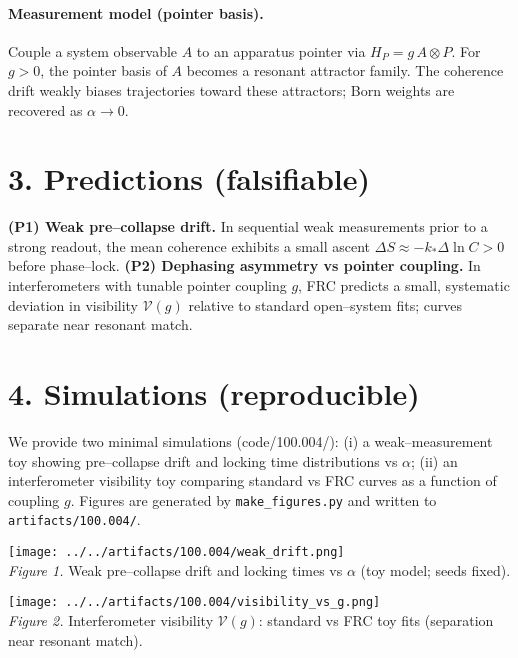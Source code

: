 \documentclass[10pt]{article}
\begin{document}
\paragraph{Measurement model (pointer basis).}
Couple a system observable $A$ to an apparatus pointer via $H_P=g\,A\otimes P$. For $g>0$, the pointer basis of $A$ becomes a resonant attractor family. The coherence drift weakly biases trajectories toward these attractors; Born weights are recovered as $\alpha\to 0$.

\section*{3. Predictions (falsifiable)}
\textbf{(P1) Weak pre--collapse drift.} In sequential weak measurements prior to a strong readout, the mean coherence exhibits a small ascent $\Delta S\approx -k_*\Delta\ln C>0$ before phase--lock.\newline
\textbf{(P2) Dephasing asymmetry vs pointer coupling.} In interferometers with tunable pointer coupling $g$, FRC predicts a small, systematic deviation in visibility $\mathcal{V}(g)$ relative to standard open--system fits; curves separate near resonant match.

\section*{4. Simulations (reproducible)}
We provide two minimal simulations (code/100.004/): (i) a weak--measurement toy showing pre--collapse drift and locking time distributions vs $\alpha$; (ii) an interferometer visibility toy comparing standard vs FRC curves as a function of coupling $g$. Figures are generated by \texttt{make\_figures.py} and written to \texttt{artifacts/100.004/}.

\begin{center}
\texttt{[image: ../../artifacts/100.004/weak\_drift.png]}\\
\emph{Figure 1.} Weak pre--collapse drift and locking times vs $\alpha$ (toy model; seeds fixed).
\end{center}

\begin{center}
\texttt{[image: ../../artifacts/100.004/visibility\_vs\_g.png]}\\
\emph{Figure 2.} Interferometer visibility $\mathcal{V}(g)$: standard vs FRC toy fits (separation near resonant match).
\end{center}
\end{document}
